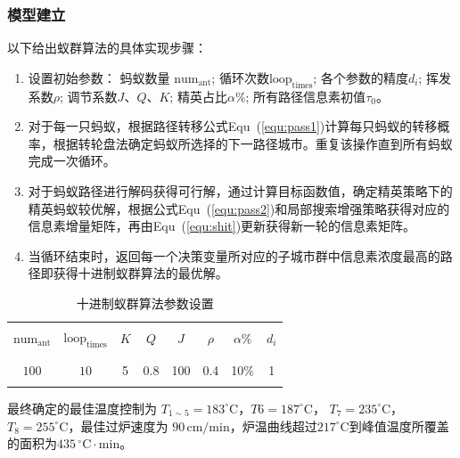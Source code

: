 \documentclass[../main.tex]{subfiles}
\begin{document}
\subsubsection{模型建立}
以下给出蚁群算法的具体实现步骤：
\begin{enumerate}
	\item 设置初始参数：
	蚂蚁数量 \(\mathrm{num}_{\mathrm{ant}}\); 循环次数\(\mathrm{loop}_{\mathrm{times}}\); 各个参数的精度\(d_i\); 挥发系数\(\rho\); 调节系数\(J\)、\(Q\)、\(K\); 精英占比\(\alpha  \%\); 所有路径信息素初值\(τ_0\)。
	\item 对于每一只蚂蚁，根据路径转移公式Equ~(\ref{equ:pass1})计算每只蚂蚁的转移概率，根据转轮盘法确定蚂蚁所选择的下一路径城市。重复该操作直到所有蚂蚁完成一次循环。
	\item 对于蚂蚁路径进行解码获得可行解，通过计算目标函数值，确定精英策略下的精英蚂蚁较优解，根据公式Equ~(\ref{equ:pass2})和局部搜索增强策略获得对应的信息素增量矩阵，再由Equ~(\ref{equ:shit})更新获得新一轮的信息素矩阵。
	\item 当循环结束时，返回每一个决策变量所对应的子城市群中信息素浓度最高的路径即获得十进制蚁群算法的最优解。
\end{enumerate}
\begin{table}[H]
	\centering
	\begin{tabular}{cccccccc}
	\hline 	\hline
	\\[-1em]
	\(\mathrm{num}_{\mathrm{ant}}\) & \(\mathrm{loop}_{\mathrm{times}}\) & \(K\) & \(Q\) & \(J\) & \(\rho\) & \(\alpha\%\) & \(d_{i}\) \\
	\\[-1em]
	\hline
	\\[-1em]
	\(100\)  & \(10\)  & 5  & 0.8  & 100  & 0.4  & 10\%  & 1
	\\[-1em]
	\\ \hline
	\end{tabular}
	\caption{十进制蚁群算法参数设置}
\end{table}
最终确定的最佳温度控制为 \(T _{1 \sim 5}= 183 ^{\circ}\mathrm{C}\)，\(T6 = 187^{\circ}\mathrm{C}\)，
\(T_{7} = 235^{\circ}\mathrm{C}\)，\(T_8 = 255^{\circ}\mathrm{C}\)，最佳过炉速度为 \(90\,\mathrm{cm}/\mathrm{min}\)，炉温曲线超过\(217 ^{\circ}\mathrm{C}\)到峰值温度所覆盖的面积为\(435\,^{\circ}\mathrm{C} \cdot \mathrm{min}\)。
\end{document}
